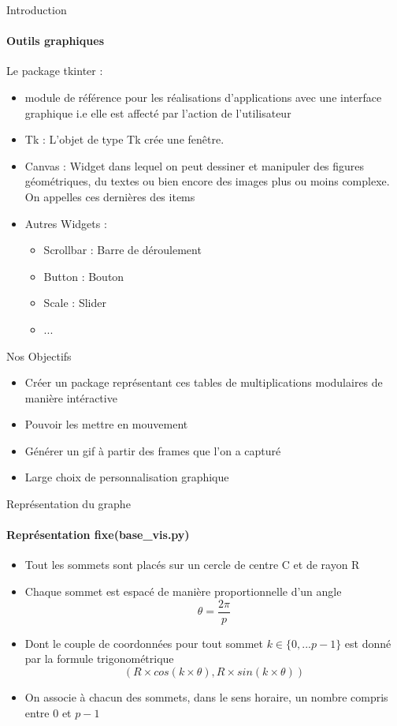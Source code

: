 \documentclass{beamer}
\begin{document}
\begin{frame}{Introduction}
\framesubtitle{Outils graphiques}
Le package tkinter :
\begin{itemize}
\item module de référence pour les réalisations d'applications avec une interface graphique i.e elle est affecté par l'action de l'utilisateur
\item Tk : L'objet de type Tk crée une fenêtre.
\item Canvas : Widget dans lequel on peut dessiner et manipuler des figures géométriques, du textes ou bien encore des images plus ou moins complexe. On appelles ces dernières des items
\item Autres Widgets : 
\begin{itemize}
\item Scrollbar : Barre de déroulement
\item Button : Bouton
\item Scale : Slider 
\item ...
\end{itemize}
\end{itemize}
\end{frame}

\begin{frame}{Nos Objectifs}
\begin{itemize}
\item Créer un package représentant ces tables de multiplications modulaires de manière intéractive
\item Pouvoir les mettre en mouvement 
\item Générer un gif à partir des frames que l'on a capturé 
\item Large choix de personnalisation graphique
\end{itemize}
\end{frame}

\begin{frame}{Représentation du graphe}
\framesubtitle{Représentation fixe(base\_vis.py)}
\begin{itemize}
\item Tout les sommets sont placés sur un cercle de centre C et de rayon R
\item Chaque sommet est espacé de manière proportionnelle d'un angle $$\theta=\frac{2\pi}{p}$$
\item Dont le couple de coordonnées pour tout sommet $k \in \{0,...p-1\} $ est donné par la formule trigonométrique $$(R\times cos(k\times \theta),R\times sin(k\times \theta))$$
\item On associe à chacun des sommets, dans le sens horaire, un nombre compris entre 0 et $p-1$ 
\end{itemize} 
\end{frame}
\end{document}

